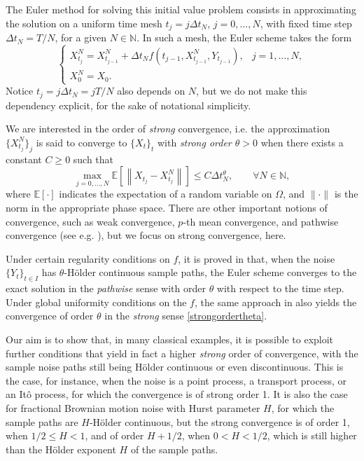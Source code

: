 \documentclass[reqno,12pt]{amsart}
\theoremstyle{plain} %
\theoremstyle{definition} %
\begin{document}
The Euler method for solving this initial value problem consists in approximating the solution on a uniform time mesh $t_j = j\Delta t_N$, $j = 0, \ldots, N$, with fixed time step $\Delta t_N = T/N$, for a given $N\in \mathbb{N}$. In such a mesh, the Euler scheme takes the form
\begin{equation}
  \label{emscheme}
  \begin{cases}
    X_{t_j}^N = X_{t_{j-1}}^N + \Delta t_N f(t_{j-1}, X_{t_{j-1}}^N, Y_{t_{j-1}}), & j = 1, \ldots, N, \\
    X_0^N = X_0.
  \end{cases}
\end{equation}
Notice $t_j = j\Delta t_N = jT/N$ also depends on $N$, but we do not make this dependency explicit, for the sake of notational simplicity.

We are interested in the order of \emph{strong} convergence, i.e. the approximation $\{X_{t_j}^N\}_j$ is said to converge to $\{X_t\}_t$ with \emph{strong order $\theta>0$} when there exists a constant $C \geq 0$ such that
\begin{equation}
    \label{strongordertheta}
    \max_{j=0, \ldots, N}\mathbb{E}\left[ \left\| X_{t_j} - X_{t_j}^N \right\| \right] \leq C \Delta t_N^\theta, \qquad \forall N \in \mathbb{N},
\end{equation}
where $\mathbb{E}[\cdot]$ indicates the expectation of a random variable on $\Omega$, and $\|\cdot\|$ is the norm in the appropriate phase space. There are other important notions of convergence, such as weak convergence, $p$-th mean convergence, and pathwise convergence (see e.g. \cite{HanKloeden2017,HighamKloeden2021, JentzenKloeden2011}), but we focus on strong convergence, here.

Under certain regularity conditions on $f$, it is proved in \cite{GruneKloeden2001} that, when the noise $\{Y_t\}_{t\in I}$ has $\theta$-H\"older continuous sample paths, the Euler scheme converges to the exact solution in the \emph{pathwise} sense with order $\theta$ with respect to the time step. Under global uniformity conditions on the $f$, the same approach in \cite{GruneKloeden2001} also yields the convergence of order $\theta$ in the \emph{strong} sense \eqref{strongordertheta}.

Our aim is to show that, in many classical examples, it is possible to exploit further conditions that yield in fact a higher \emph{strong} order of convergence, with the sample noise paths still being H\"older continuous or even discontinuous. This is the case, for instance, when the noise is a point process, a transport process, or an It\^o process, for which the convergence is of strong order 1. It is also the case for fractional Brownian motion noise with Hurst parameter $H$, for which the sample paths are $H$-H\"older continuous, but the strong convergence is of order 1, when $1/2 \leq H < 1$, and of order $H + 1/2$, when $0 < H < 1/2$, which is still higher than the H\"older exponent $H$ of the sample paths.
\end{document}
